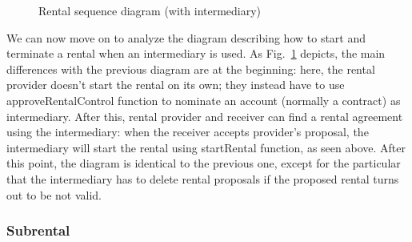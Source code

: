 \documentclass[english, LaM, oneside]{sapthesis}%
\begin{document}
\begin{figure}
    \centering
        \begin{adjustbox}{width=1\textwidth}
        \end{adjustbox}
    \caption{Rental sequence diagram (with intermediary)}
    \label{fig:Rental_intermediary SD}
\end{figure}

We can now move on to analyze the diagram describing how to start and terminate a rental when an intermediary is used. As Fig.~\ref{fig:Rental_intermediary SD} depicts, the main differences with the previous diagram are at the beginning: here, the rental provider doesn't start the rental on its own; they instead have to use approveRentalControl function to nominate an account (normally a contract) as intermediary. After this, rental provider and receiver can find a rental agreement using the intermediary: when the receiver accepts provider's proposal, the intermediary will start the rental using startRental function, as seen above. After this point, the diagram is identical to the previous one, except for the particular that the intermediary has to delete rental proposals if the proposed rental turns out to be not valid.


\subsubsection{Subrental}
\end{document}

